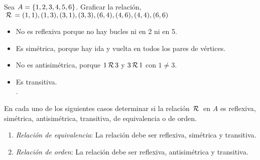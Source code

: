 \documentclass[12pt,a4paper, spanish]{article}
\begin{document}
\ejercicio Sea $A = \left\{ 1, 2, 3, 4, 5, 6 \right\}$. Graficar la relación, $\,\mathcal{R}\,= {(1,1), (1,3), (3,1), (3,3), (6,4), (4,6), (4,4), (6,6)}$
\begin{minipage}{0.25\textwidth}
	\veinte
\end{minipage}
\begin{minipage}{0.7\textwidth}
	\begin{itemize}
		\item No es reflexiva porque no hay bucles ni en 2 ni en 5.
		\item Es simétrica, porque hay ida y vuelta en todos los pares de vértices.
		\item No es antisimétrica, porque $1 \,\mathcal{R}\, 3$ y $3 \,\mathcal{R}\, 1$ con $1 \neq 3$.
		\item Es transitiva. \\
		      .
	\end{itemize}
\end{minipage}

\ejercicio \hacer

\ejercicio En cada uno de los siguientes casos determinar si la relación $\,\mathcal{R}\, $ en $A$ es reflexiva, simétrica,
antisimétrica, transitiva, de equivalencia o de orden.

\begin{enumerate}
	\item \textit{Relación de equivalencia}: La relación debe ser reflexiva, simétrica y transitiva.
	\item \textit{Relación de orden}: La relación debe ser reflexiva, antisimétrica y transitiva.
\end{enumerate}
\end{document}
